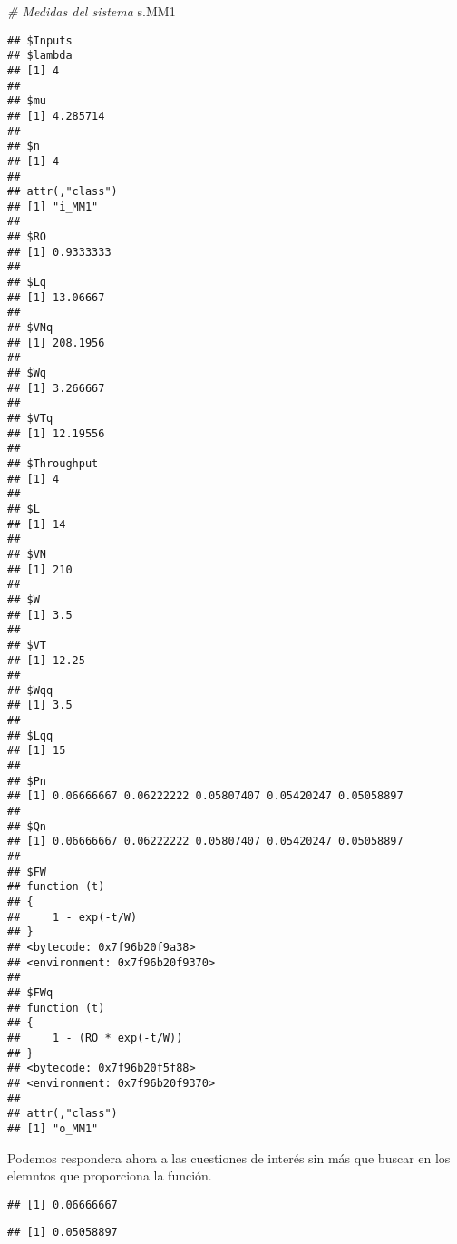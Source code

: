\documentclass[
]{book}
\newenvironment{Shaded}{\begin{snugshade}}{\end{snugshade}}
\newcommand{\CommentTok}[1]{\textcolor[rgb]{0.56,0.35,0.01}{\textit{#1}}}
\newcommand{\DecValTok}[1]{\textcolor[rgb]{0.00,0.00,0.81}{#1}}
\newcommand{\NormalTok}[1]{#1}
\newcommand{\SpecialCharTok}[1]{\textcolor[rgb]{0.00,0.00,0.00}{#1}}
\theoremstyle{definition}
\theoremstyle{definition}
\theoremstyle{definition}
\theoremstyle{definition}
\theoremstyle{remark}
\begin{document}
\begin{Shaded}
\begin{Highlighting}[]
\CommentTok{\# Medidas del sistema}
\NormalTok{s.MM1}
\end{Highlighting}
\end{Shaded}

\begin{verbatim}
## $Inputs
## $lambda
## [1] 4
## 
## $mu
## [1] 4.285714
## 
## $n
## [1] 4
## 
## attr(,"class")
## [1] "i_MM1"
## 
## $RO
## [1] 0.9333333
## 
## $Lq
## [1] 13.06667
## 
## $VNq
## [1] 208.1956
## 
## $Wq
## [1] 3.266667
## 
## $VTq
## [1] 12.19556
## 
## $Throughput
## [1] 4
## 
## $L
## [1] 14
## 
## $VN
## [1] 210
## 
## $W
## [1] 3.5
## 
## $VT
## [1] 12.25
## 
## $Wqq
## [1] 3.5
## 
## $Lqq
## [1] 15
## 
## $Pn
## [1] 0.06666667 0.06222222 0.05807407 0.05420247 0.05058897
## 
## $Qn
## [1] 0.06666667 0.06222222 0.05807407 0.05420247 0.05058897
## 
## $FW
## function (t) 
## {
##     1 - exp(-t/W)
## }
## <bytecode: 0x7f96b20f9a38>
## <environment: 0x7f96b20f9370>
## 
## $FWq
## function (t) 
## {
##     1 - (RO * exp(-t/W))
## }
## <bytecode: 0x7f96b20f5f88>
## <environment: 0x7f96b20f9370>
## 
## attr(,"class")
## [1] "o_MM1"
\end{verbatim}

Podemos respondera ahora a las cuestiones de interés sin más que buscar en los elemntos que proporciona la función.

\begin{Shaded}
\end{Shaded}

\begin{verbatim}
## [1] 0.06666667
\end{verbatim}

\begin{Shaded}
\end{Shaded}

\begin{verbatim}
## [1] 0.05058897
\end{verbatim}
\end{document}
